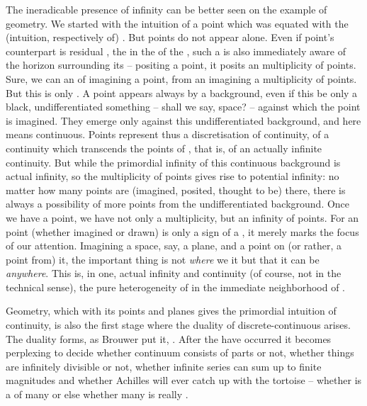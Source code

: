\pa The ineradicable presence of infinity can be better seen on the example of
geometry.  We started with the intuition of a point which was equated with the
(intuition, respectively  of) .  But
points do not appear alone.  Even if point's counterpart is residual
, the  in the  of the
, such a  is also immediately aware of
the  horizon surrounding its  -- positing a
point, it posits an  multiplicity of points.  Sure, we can
 an  of imagining a point, from an 
imagining a multiplicity of points. But this is only . A point appears always  by a background, even
if this be only a black, undifferentiated something -- shall we say, space?  --
against which the point is imagined.  They emerge only against this
undifferentiated background, and here  means continuous.
Points represent thus a discretisation of continuity, of a continuity which
transcends the points of , that is, of an actually infinite
continuity. But while the primordial infinity of this continuous background is
actual infinity, so the multiplicity of points gives rise to potential infinity:
no matter how many points are (imagined, posited, thought to be) there, there is
always a possibility of  more points from the undifferentiated
background.  Once we have a point, we have not only a multiplicity, but an
infinity of points.  For an  point (whether imagined or drawn) is
only a sign of a , it merely marks the focus
of our attention.  Imagining a space, say, a plane, and  a point on
(or rather,  a point from) it, the important thing is not {\em
  where} we  it but that it can be  {\em anywhere}. This is,
in one, actual infinity and continuity (of course, not in the technical sense),
the pure heterogeneity of  in the immediate neighborhood of
.

Geometry, which with its points and planes gives the primordial intuition of
continuity, is also the first stage where the duality of discrete-continuous
arises.  The duality forms, as Brouwer put it, .  After the
 have occurred it becomes perplexing to decide whether
continuum consists of parts or not, whether things are infinitely divisible or
not, whether infinite series can sum up to finite magnitudes and whether
Achilles will ever catch up with the tortoise -- whether  is a
 of many or else whether  many is really .


